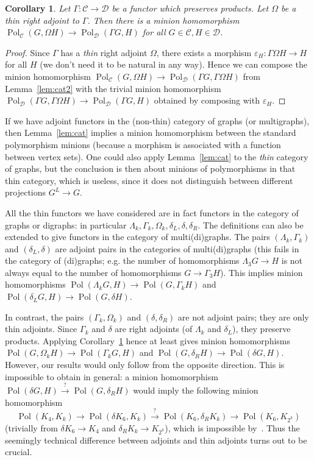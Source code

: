 \documentclass[11pt,a4paper]{scrartcl}
\numberwithin{theorem}{section}
\newtheorem{corollary}[theorem]{Corollary}
\theoremstyle{definition}
\newcommand{\eps}{\varepsilon}
\newcommand{\Cc}{\mathcal{C}}
\newcommand{\Dd}{\mathcal{D}}
\DeclareMathOperator{\Pol}{Pol}
\begin{document}
\begin{corollary}\label{cor:cat}
	Let $\Gamma\colon \Cc \to \Dd$ be a functor which preserves products.
	Let $\Omega$ be a thin right adjoint to $\Gamma$.
	Then there is a minion homomorphism $\Pol_\Cc(G,\Omega H) \to \Pol_{\Dd}(\Gamma G, H)$ for all $G \in \Cc, H \in \Dd$.
\end{corollary}
\begin{proof}
	Since $\Gamma$ has a \emph{thin} right adjoint $\Omega$,
	there exists a morphism $\eps_H\colon \Gamma \Omega H \to H$ for all $H$ (we don't need it to be natural in any way).
	Hence we can compose the minion homomorphism $\Pol_\Cc(G,\Omega H) \to \Pol_{\Dd}(\Gamma G, \Gamma \Omega H)$
	from Lemma~\ref{lem:cat2} with the trivial minion homomorphism $\Pol_{\Dd}(\Gamma G, \Gamma \Omega H) \to \Pol_{\Dd}(\Gamma G, H)$ obtained by composing with $\eps_H$.
\end{proof}

If we have adjoint functors in the (non-thin) category of graphs (or multigraphs), then Lemma~\ref{lem:cat} implies a minion homomorphism between the standard polymorphism minions (because a morphism is associated with a function between vertex sets).
One could also apply Lemma~\ref{lem:cat} to the \emph{thin} category of graphs, but the conclusion is then about minions of polymorphisms in that thin category, which is useless, since it does not distinguish between different projections $G^L \to G$.

All the thin functors we have considered are in fact functors in the category of graphs or digraphs: in particular $\Lambda_k,\Gamma_k,\Omega_k,\delta_L,\delta,\delta_R$.
The definitions can also be extended to give functors in the category of multi(di)graphs.
The pairs $(\Lambda_k,\Gamma_k)$ and $(\delta_L,\delta)$ are adjoint pairs in the categories of multi(di)graphs
(this fails in the category of (di)graphs; e.g. the number of homomorphisms $\Lambda_3 G \to H$ is not always equal to the number of homomorphisms $G \to \Gamma_3 H$).
This implies minion homomorphisms $\Pol(\Lambda_k G, H) \to \Pol(G,\Gamma_k H)$ and 
$\Pol(\delta_L G, H) \to \Pol(G,\delta H)$.


In contrast, the pairs $(\Gamma_k,\Omega_k)$ and $(\delta,\delta_R)$ are not adjoint pairs; they are only thin adjoints.
Since $\Gamma_k$ and $\delta$ are right adjoints (of $\Lambda_k$ and $\delta_L$), they preserve products.
Applying Corollary~\ref{cor:cat} hence at least gives minion homomorphisms
$\Pol(G, \Omega_k H) \to \Pol(\Gamma_k G, H)$ and 
$\Pol(G, \delta_R H) \to \Pol(\delta G, H)$.
However, our results would only follow from the opposite direction.
This is impossible to obtain in general: a minion homomorphism
$\Pol(\delta G, H) \xrightarrow{?} \Pol(G, \delta_R H)$
would imply the following minion homomorphism
\[\Pol(K_4, K_k) \to \Pol(\delta K_6, K_k) \xrightarrow{?} \Pol(K_6, \delta_R K_k) \to \Pol(K_6, K_{2^k})\]
(trivially from $\delta K_6 \to K_4$ and $\delta_R K_k \to K_{2^k}$),
which is impossible by~\cite[Proposition~10.3]{BartoBKO19}.
Thus the seemingly technical difference between adjoints and thin adjoints turns out to be crucial.
\end{document}
